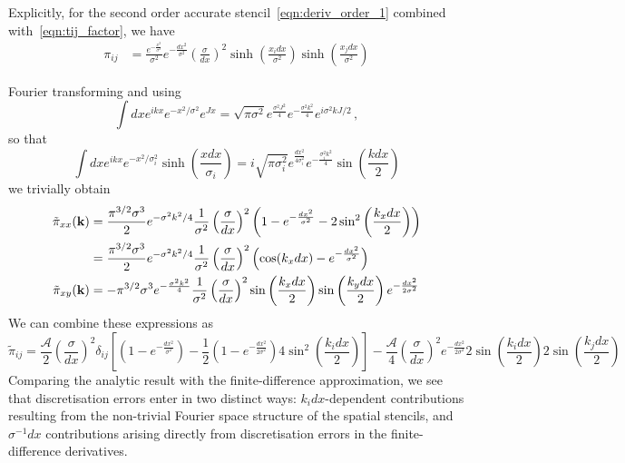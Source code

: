\documentclass{revtex4}
\begin{document}
Explicitly, for the second order accurate stencil~\eqref{eqn:deriv_order_1} combined with~\eqref{eqn:tij_factor}, we have
\begin{align}
  \pi_{ij} &= \frac{e^{-\frac{x^2}{\sigma^2}}}{\sigma^2}e^{-\frac{dx^2}{\sigma^2}}\left(\frac{\sigma}{dx}\right)^2\sinh\left(\frac{x_idx}{\sigma^2}\right)\sinh\left(\frac{x_jdx}{\sigma^2}\right) 
\end{align}

Fourier transforming and using
\begin{equation}
  \int dx e^{ikx}e^{-x^2/\sigma^2}e^{Jx} = \sqrt{\pi\sigma^2}e^{\frac{\sigma^2 J^2}{4}}e^{-\frac{\sigma^2 k^2}{4}}e^{i\sigma^2kJ/2} \, ,
\end{equation}
so that
\begin{equation}
  \int dx e^{ikx}e^{-x^2/\sigma_i^2}\sinh\left(\frac{xdx}{\sigma_i}\right) = i\sqrt{\pi\sigma_i^2}e^{\frac{dx^2}{4\sigma_i^2}}e^{-\frac{\sigma_i^2k^2}{4}}\sin\left(\frac{kdx}{2}\right)
\end{equation}
we trivially obtain
\begin{subequations}
\begin{align}
  \tilde{\pi}_{xx}({\bf k}) &= \frac{\pi^{3/2}\sigma^3}{2}e^{-\sigma^2 k^2/4}\frac{1}{\sigma^2}\left(\frac{\sigma}{dx}\right)^2\left(1-e^{-\frac{dx^2}{\sigma^2}} - 2\sin^2\left(\frac{k_xdx}{2}\right)\right) \\
  &= \frac{\pi^{3/2}\sigma^3}{2}e^{-\sigma^2 k^2/4}\frac{1}{\sigma^2}\left(\frac{\sigma}{dx}\right)^2\left(\cos(k_xdx) - e^{-\frac{dx^2}{\sigma^2}}\right) \\
  \tilde{\pi}_{xy}({\bf k}) &= -\pi^{3/2}\sigma^3e^{-\frac{\sigma^2k^2}{4}}\frac{1}{\sigma^2}\left(\frac{\sigma}{dx}\right)^2\sin\left(\frac{k_xdx}{2}\right)\sin\left(\frac{k_ydx}{2}\right)e^{-\frac{dx^2}{2\sigma^2}}
\end{align}
\end{subequations}
We can combine these expressions as
\begin{equation}
  \tilde{\pi}_{ij} = \frac{\mathcal{A}}{2}\left(\frac{\sigma}{dx}\right)^2\delta_{ij}\left[\left(1-e^{-\frac{dx^2}{\sigma^2}}\right) - \frac{1}{2}\left(1-e^{-\frac{dx^2}{2\sigma^2}}\right)4\sin^2\left(\frac{k_idx}{2}\right)\right] - \frac{\mathcal{A}}{4}\left(\frac{\sigma}{dx}\right)^2e^{-\frac{dx^2}{2\sigma^2}}2\sin\left(\frac{k_idx}{2}\right)2\sin\left(\frac{k_jdx}{2}\right)
\end{equation}
Comparing the analytic result with the finite-difference approximation, we see that discretisation errors enter in two distinct ways: $k_idx$-dependent contributions resulting from the non-trivial Fourier space structure of the spatial stencils, and $\sigma^{-1}dx$ contributions arising directly from discretisation errors in the finite-difference derivatives.
\end{document}
